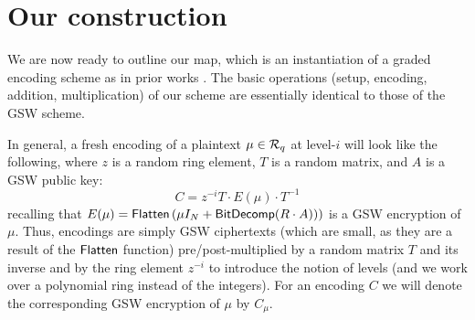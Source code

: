 \section{Our construction}

We are now ready to outline our map, which is an instantiation of a graded encoding scheme as in prior works \cite{clt, ggh13a, clt15}.  The basic operations (setup, encoding, addition, multiplication) of our scheme are essentially identical to those of the GSW scheme.

In general, a fresh encoding of a plaintext $\mu \in \mathcal{R}_q$ at level-$i$ will look like the following, where $z$ is a random ring element, $T$ is a random matrix, and $A$ is a GSW public key:
$$C = z^{-i}T \cdot E(\mu)\cdot T^{-1}$$
recalling that $E(\mu) = \mathsf{Flatten}\left(\mu I_{N} + \mathsf{BitDecomp}(R\cdot A))\right)$ is a GSW encryption of $\mu$. Thus, encodings are simply GSW ciphertexts (which are small, as they are a result of the $\mathsf{Flatten}$ function) pre/post-multiplied by a random matrix $T$ and its inverse and by the ring element $z^{-i}$ to introduce the notion of levels (and we work over a polynomial ring instead of the integers).  For an encoding $C$ we will denote the corresponding GSW encryption of $\mu$ by $C_\mu$.

